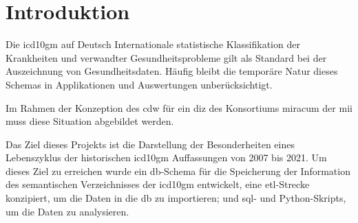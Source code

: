 \chapter{Introduktion}

	Die \ac{icd10gm} auf Deutsch Internationale statistische Klassifikation der Krankheiten und  verwandter Gesundheitsprobleme \cite{icd10} gilt als Standard bei der Auszeichnung von Gesundheitsdaten. Häufig bleibt die temporäre Natur dieses Schemas in Applikationen und Auswertungen unberücksichtigt.
	
	Im Rahmen der Konzeption des \ac{cdw} für ein  \ac{diz} des Konsortiums \ac{miracum} der \ac{mii} muss diese Situation abgebildet werden.%
	
	Das Ziel dieses Projekts ist die Darstellung der Besonderheiten eines Lebenszyklus der historischen \ac{icd10gm} Auffassungen von 2007 bis 2021. Um dieses Ziel zu erreichen wurde ein \ac{db}-Schema für die Speicherung der Information des semantischen Verzeichnisses der \ac{icd10gm} entwickelt, eine \ac{etl}-Strecke konzipiert, um die Daten in die \ac{db} zu importieren; und \ac{sql}- und Python-Skripts, um die Daten zu analysieren.
	